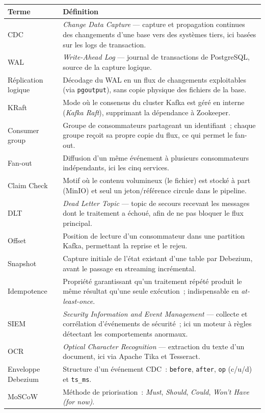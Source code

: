 \documentclass[12pt,a4paper,openany]{report}
\begin{document}
    \begin{longtable}{lp{10cm}}
      \toprule
      \textbf{Terme} & \textbf{D\'efinition} \\
      \midrule
      \endhead
      \bottomrule
      \endfoot

      CDC & \textit{Change Data Capture} --- capture et propagation continues des changements d'une base vers des syst\`emes tiers, ici bas\'ees sur les logs de transaction. \\[4pt]
      WAL & \textit{Write-Ahead Log} --- journal de transactions de PostgreSQL, source de la capture logique. \\[4pt]
      R\'eplication logique & D\'ecodage du WAL en un flux de changements exploitables (via \texttt{pgoutput}), sans copie physique des fichiers de la base. \\[4pt]
      KRaft & Mode o\`u le consensus du cluster Kafka est g\'er\'e en interne (\textit{Kafka Raft}), supprimant la d\'ependance \`a Zookeeper. \\[4pt]
      Consumer group & Groupe de consommateurs partageant un identifiant~; chaque groupe re\c{c}oit sa propre copie du flux, ce qui permet le fan-out. \\[4pt]
      Fan-out & Diffusion d'un m\^eme \'ev\'enement \`a plusieurs consommateurs ind\'ependants, ici les cinq services. \\[4pt]
      Claim Check & Motif o\`u le contenu volumineux (le fichier) est stock\'e \`a part (MinIO) et seul un jeton/r\'ef\'erence circule dans le pipeline. \\[4pt]
      DLT & \textit{Dead Letter Topic} --- topic de secours recevant les messages dont le traitement a \'echou\'e, afin de ne pas bloquer le flux principal. \\[4pt]
      Offset & Position de lecture d'un consommateur dans une partition Kafka, permettant la reprise et le rejeu. \\[4pt]
      Snapshot & Capture initiale de l'\'etat existant d'une table par Debezium, avant le passage en streaming incr\'emental. \\[4pt]
      Idempotence & Propri\'et\'e garantissant qu'un traitement r\'ep\'et\'e produit le m\^eme r\'esultat qu'une seule ex\'ecution~; indispensable en \textit{at-least-once}. \\[4pt]
      SIEM & \textit{Security Information and Event Management} --- collecte et corr\'elation d'\'ev\'enements de s\'ecurit\'e~; ici un moteur \`a r\`egles d\'etectant les comportements anormaux. \\[4pt]
      OCR & \textit{Optical Character Recognition} --- extraction du texte d'un document, ici via Apache Tika et Tesseract. \\[4pt]
      Enveloppe Debezium & Structure d'un \'ev\'enement CDC~: \texttt{before}, \texttt{after}, \texttt{op} (c/u/d) et \texttt{ts\_ms}. \\[4pt]
      MoSCoW & M\'ethode de priorisation~: \textit{Must}, \textit{Should}, \textit{Could}, \textit{Won't Have (for now)}. \\
    \end{longtable}

    
\end{document}
